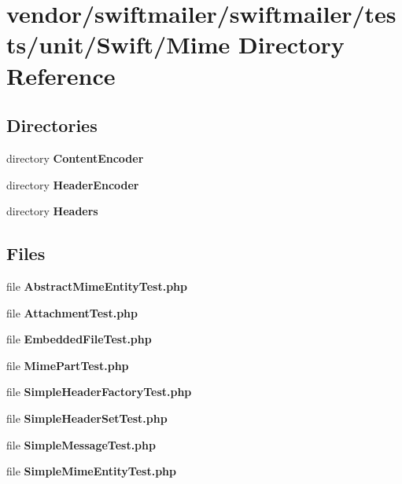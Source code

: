 \section{vendor/swiftmailer/swiftmailer/tests/unit/\+Swift/\+Mime Directory Reference}
\label{dir_2c518de0d795a12cc943fd61c17c3f23}
\subsection*{Directories}
\begin{DoxyCompactItemize}
\item 
directory {\bf Content\+Encoder}
\item 
directory {\bf Header\+Encoder}
\item 
directory {\bf Headers}
\end{DoxyCompactItemize}
\subsection*{Files}
\begin{DoxyCompactItemize}
\item 
file {\bf Abstract\+Mime\+Entity\+Test.\+php}
\item 
file {\bf Attachment\+Test.\+php}
\item 
file {\bf Embedded\+File\+Test.\+php}
\item 
file {\bf Mime\+Part\+Test.\+php}
\item 
file {\bf Simple\+Header\+Factory\+Test.\+php}
\item 
file {\bf Simple\+Header\+Set\+Test.\+php}
\item 
file {\bf Simple\+Message\+Test.\+php}
\item 
file {\bf Simple\+Mime\+Entity\+Test.\+php}
\end{DoxyCompactItemize}
